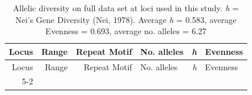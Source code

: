 \begin{longtable}[]{@{}rrrlrl@{}}
\caption{\label{tab:locus-stats} Allelic diversity on full data set at loci
used in this study. \emph{h} = Nei's Gene Diversity (Nei, 1978). Average
\emph{h} = 0.583, average Evenness = 0.693, average no. alleles =
6.27}\tabularnewline
\toprule
\begin{minipage}[b]{0.08\columnwidth}\raggedleft\strut
Locus\strut
\end{minipage} & \begin{minipage}[b]{0.10\columnwidth}\raggedleft\strut
Range\strut
\end{minipage} & \begin{minipage}[b]{0.29\columnwidth}\raggedleft\strut
Repeat Motif\strut
\end{minipage} & \begin{minipage}[b]{0.14\columnwidth}\raggedright\strut
No. alleles\strut
\end{minipage} & \begin{minipage}[b]{0.06\columnwidth}\raggedleft\strut
\emph{h}\strut
\end{minipage} & \begin{minipage}[b]{0.10\columnwidth}\raggedright\strut
Evenness\strut
\end{minipage}\tabularnewline
\midrule
\endfirsthead
\toprule
\begin{minipage}[b]{0.08\columnwidth}\raggedleft\strut
Locus\strut
\end{minipage} & \begin{minipage}[b]{0.10\columnwidth}\raggedleft\strut
Range\strut
\end{minipage} & \begin{minipage}[b]{0.29\columnwidth}\raggedleft\strut
Repeat Motif\strut
\end{minipage} & \begin{minipage}[b]{0.14\columnwidth}\raggedright\strut
No. alleles\strut
\end{minipage} & \begin{minipage}[b]{0.06\columnwidth}\raggedleft\strut
\emph{h}\strut
\end{minipage} & \begin{minipage}[b]{0.10\columnwidth}\raggedright\strut
Evenness\strut
\end{minipage}\tabularnewline
\midrule
\endhead
\begin{minipage}[t]{0.08\columnwidth}\raggedleft\strut
5-2\strut
\end{minipage} & \begin{minipage}[t]{0.10\columnwidth}\raggedleft\strut

\end{minipage}
\end{longtable}
